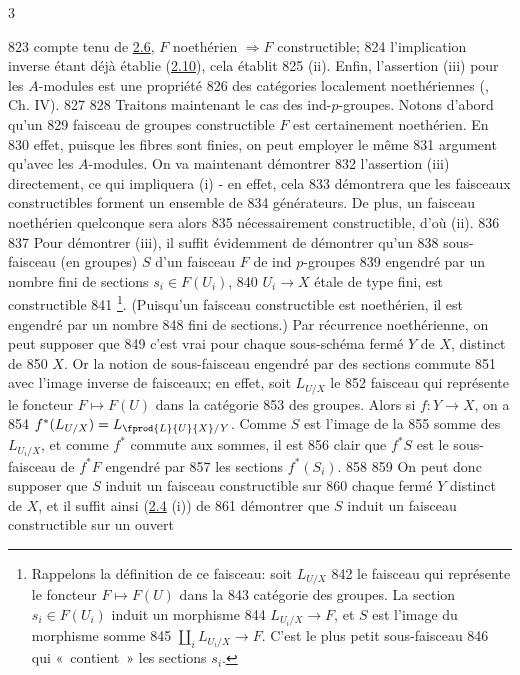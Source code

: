 3	\documentclass[10pt]{../fichiers-configuration-latex/smfart}
\begin{document}
   823	compte tenu de \hyperref[IX.prop2.6]{2.6}, $F$ noethérien $\Rightarrow F$ constructible;
   824	l'implication inverse étant déjà établie (\hyperref[IX.lem2.10]{2.10}), cela établit
   825	(ii). Enfin, l'assertion (iii) pour les $A$-modules est une propriété
   826	des catégories localement noethériennes (\cf [1], Ch. IV).
   827	
   828	Traitons maintenant le cas des ind-$p$-groupes. Notons d'abord qu'un
   829	faisceau de groupes constructible $F$ est certainement noethérien. En
   830	effet, puisque les fibres sont finies, on peut employer le même
   831	argument qu'avec les $A$-modules. On va maintenant démontrer
   832	l'assertion (iii) directement, ce qui impliquera (i) - en effet, cela
   833	démontrera que les faisceaux constructibles forment un ensemble de
   834	générateurs. De plus, un faisceau noethérien quelconque sera alors
   835	nécessairement constructible, d'où (ii).
   836	
   837	Pour démontrer (iii), il suffit évidemment de démontrer qu'un
   838	sous-faisceau (en groupes) $S$ d'un faisceau $F$ de ind $p$-groupes
   839	engendré par un nombre fini de sections $s_i\in F(U_i)$,
   840	$U_i\rightarrow X$ étale de type fini, est constructible
   841	\footnote[1]{Rappelons la définition de ce faisceau: soit $L_{U/X}$
   842	le faisceau qui représente le foncteur $F\mapsto F(U)$ dans la
   843	catégorie des groupes. La section $s_i\in F(U_i)$ induit un morphisme
   844	$L_{U_i/X}\rightarrow F$, et $S$ est l'image du morphisme somme
   845	$\amalg_i L_{U_i/X}\rightarrow F$. C'est le plus petit sous-faisceau
   846	qui « contient » les sections $s_i$.}. (Puisqu'un	faisceau constructible est noethérien, il est engendré par un nombre
   848	fini de sections.) Par récurrence noethérienne, on peut supposer que
   849	c'est vrai pour chaque sous-schéma fermé $Y$ de $X$, distinct de
   850	$X$. Or la notion de sous-faisceau engendré par des sections commute
   851	avec l'image inverse de faisceaux; en effet, soit $L_{U/X}$ le
   852	faisceau qui représente le foncteur $F\mapsto F(U)$ dans la catégorie
   853	des groupes. Alors si $f:Y\rightarrow X$, on a
   854	$f^{\ast}(L_{U/X})=L_{\fprod{L}{U}{X}/Y}$. Comme $S$ est l'image de la
   855	somme des $L_{U_i/X}$, et comme $f^{\ast}$ commute aux sommes, il est
   856	clair que $f^{\ast}S$ est le sous-faisceau de $f^{\ast}F$ engendré par
   857	les sections $f^{\ast}(S_i)$.
   858	
   859	On peut donc supposer que $S$ induit un faisceau constructible sur
   860	chaque fermé $Y$ distinct de $X$, et il suffit ainsi (\hyperref[IX.prop2.4]{2.4} (i)) de
   861	démontrer que $S$ induit un faisceau constructible sur un ouvert
\end{document}
